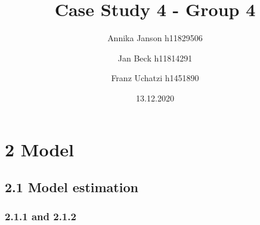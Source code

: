 \documentclass[
]{article}
\title{Case Study 4 - Group 4}
\author{Annika Janson h11829506 \and Jan Beck h11814291 \and Franz Uchatzi h1451890}
\date{13.12.2020}
\begin{document}
\maketitle

\hypertarget{model}{%
\section{2 Model}\label{model}}

\hypertarget{model-estimation}{%
\subsection{2.1 Model estimation}\label{model-estimation}}

\hypertarget{and-2.1.2}{%
\subsubsection{2.1.1 and 2.1.2}\label{and-2.1.2}}
\end{document}

